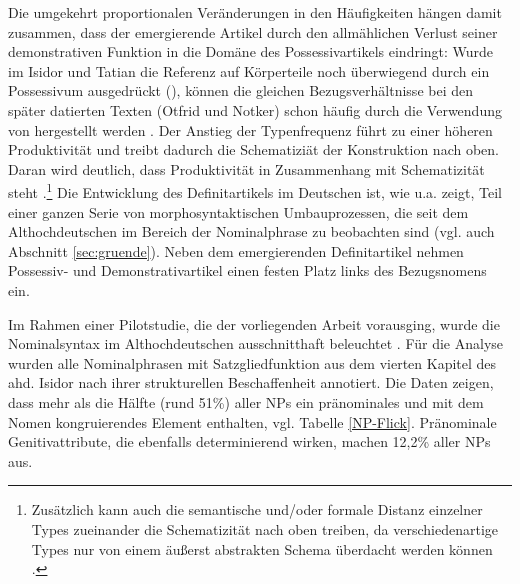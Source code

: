  
Die umgekehrt proportionalen Veränderungen in den Häufigkeiten hängen damit zusammen, dass der emergierende Artikel durch den allmählichen Verlust seiner demonstrativen Funktion in die Domäne des Possessivartikels eindringt: Wurde im Isidor und Tatian die Referenz auf Körperteile noch überwiegend durch ein Possessivum ausgedrückt (), können die gleichen Bezugsverhältnisse bei den später datierten Texten (Otfrid und Notker) schon häufig durch die Verwendung von  hergestellt werden \parencite[z.B. , s.][186]{Oubouzar1997a}. Der Anstieg der Typenfrequenz führt zu einer höheren Produktivität \parencite[vgl.][]{Baayen2009,Bybee2013} und treibt dadurch die Schematiziät der Konstruktion nach oben. Daran wird deutlich, dass Produktivität in Zusammenhang mit Schematizität steht \parencite[][]{Baayen2009}.\footnote{Zusätzlich kann auch die semantische und/oder formale Distanz einzelner Types zueinander die Schematizität nach oben treiben, da verschiedenartige Types nur von einem äußerst abstrakten Schema überdacht werden können \parencite[37]{Barddal2015}.} Die Entwicklung des Definitartikels im Deutschen ist, wie u.a. \textcite{Demske2001} zeigt, Teil einer ganzen Serie von morphosyntaktischen Umbauprozessen, die seit dem Althochdeutschen im Bereich der Nominalphrase zu beobachten sind (vgl. auch Abschnitt \ref{sec:gruende}). Neben dem emergierenden Definitartikel nehmen Possessiv- und Demonstrativartikel einen festen Platz links des Bezugsnomens ein. 


Im Rahmen einer Pilotstudie, die der vorliegenden Arbeit vorausging, wurde die Nominalsyntax im Althochdeutschen ausschnitthaft beleuchtet \parencite{Flick2018}. Für die Analyse wurden alle Nominalphrasen mit Satzgliedfunktion aus dem vierten Kapitel des ahd. Isidor nach ihrer strukturellen Beschaffenheit annotiert. Die Daten zeigen, dass mehr als die Hälfte (rund 51\%) aller NPs ein pränominales und mit dem Nomen kongruierendes Element enthalten, vgl. Tabelle \ref{NP-Flick}. Pränominale Genitivattribute, die ebenfalls determinierend wirken, machen 12,2\% aller NPs aus. 

